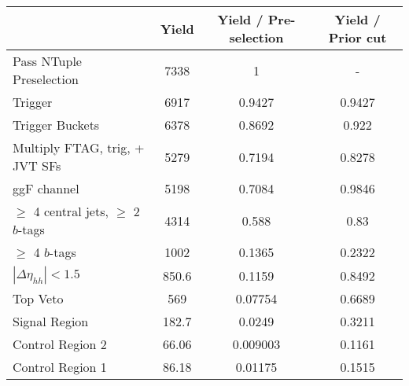 \begin{table}
{\begin{tabular}{lccc}
\toprule
{} &     Yield &  Yield / Pre-selection &  Yield / Prior cut \\
\midrule
Pass NTuple Preselection               &      7338 &                      1 &                  - \\
Trigger                                &      6917 &                 0.9427 &             0.9427 \\
Trigger Buckets                        &      6378 &                 0.8692 &              0.922 \\
Multiply FTAG, trig, + JVT SFs         &      5279 &                 0.7194 &             0.8278 \\
ggF channel                            &      5198 &                 0.7084 &             0.9846 \\
$\ge$ 4 central jets, $\ge$ 2 $b$-tags &      4314 &                  0.588 &               0.83 \\
$\ge$ 4 $b$-tags                       &      1002 &                 0.1365 &             0.2322 \\
$|\Delta\eta_{hh}| < 1.5$              &     850.6 &                 0.1159 &             0.8492 \\
Top Veto                               &       569 &                0.07754 &             0.6689 \\
Signal Region                          &     182.7 &                 0.0249 &             0.3211 \\
Control Region 2                       &     66.06 &               0.009003 &             0.1161 \\
Control Region 1                       &     86.18 &                0.01175 &             0.1515 \\
\bottomrule
\end{tabular}
} \ 
\end{table}
